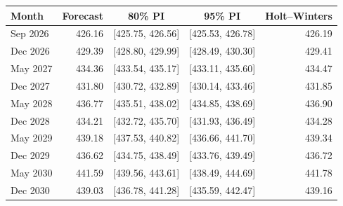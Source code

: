 \begin{tabular}{lrccr}
\toprule
Month & Forecast & 80\% PI & 95\% PI & Holt--Winters\\
\midrule
Sep 2026 & 426.16 & {}[425.75, 426.56] & {}[425.53, 426.78] & 426.19\\
Dec 2026 & 429.39 & {}[428.80, 429.99] & {}[428.49, 430.30] & 429.41\\
May 2027 & 434.36 & {}[433.54, 435.17] & {}[433.11, 435.60] & 434.47\\
Dec 2027 & 431.80 & {}[430.72, 432.89] & {}[430.14, 433.46] & 431.85\\
May 2028 & 436.77 & {}[435.51, 438.02] & {}[434.85, 438.69] & 436.90\\
Dec 2028 & 434.21 & {}[432.72, 435.70] & {}[431.93, 436.49] & 434.28\\
May 2029 & 439.18 & {}[437.53, 440.82] & {}[436.66, 441.70] & 439.34\\
Dec 2029 & 436.62 & {}[434.75, 438.49] & {}[433.76, 439.49] & 436.72\\
May 2030 & 441.59 & {}[439.56, 443.61] & {}[438.49, 444.69] & 441.78\\
Dec 2030 & 439.03 & {}[436.78, 441.28] & {}[435.59, 442.47] & 439.16\\
\bottomrule
\end{tabular}
